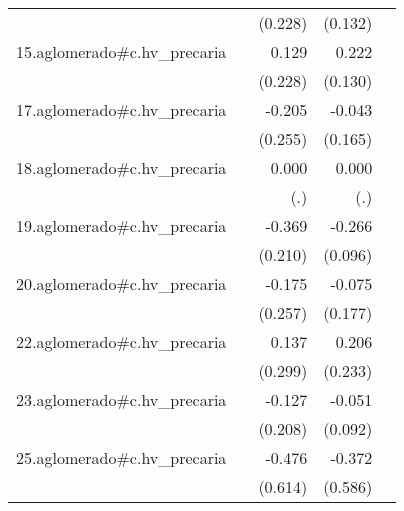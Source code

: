 {\begin{longtable}{l*{4}{D{.}{.}{-1}}}
            &                     &     (0.228)         &     (0.132)         &                     \\
\addlinespace
15.aglomerado#c.hv\_precaria&                     &       0.129         &       0.222         &                     \\
            &                     &     (0.228)         &     (0.130)         &                     \\
\addlinespace
17.aglomerado#c.hv\_precaria&                     &      -0.205         &      -0.043         &                     \\
            &                     &     (0.255)         &     (0.165)         &                     \\
\addlinespace
18.aglomerado#c.hv\_precaria&                     &       0.000         &       0.000         &                     \\
            &                     &         (.)         &         (.)         &                     \\
\addlinespace
19.aglomerado#c.hv\_precaria&                     &      -0.369         &      -0.266\sym{**} &                     \\
            &                     &     (0.210)         &     (0.096)         &                     \\
\addlinespace
20.aglomerado#c.hv\_precaria&                     &      -0.175         &      -0.075         &                     \\
            &                     &     (0.257)         &     (0.177)         &                     \\
\addlinespace
22.aglomerado#c.hv\_precaria&                     &       0.137         &       0.206         &                     \\
            &                     &     (0.299)         &     (0.233)         &                     \\
\addlinespace
23.aglomerado#c.hv\_precaria&                     &      -0.127         &      -0.051         &                     \\
            &                     &     (0.208)         &     (0.092)         &                     \\
\addlinespace
25.aglomerado#c.hv\_precaria&                     &      -0.476         &      -0.372         &                     \\
            &                     &     (0.614)         &     (0.586)         &                     \\

\end{longtable}}

